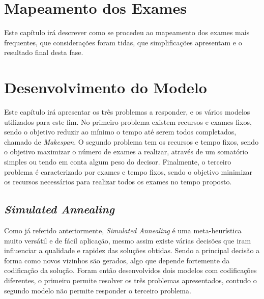 
%

\chapter{Mapeamento dos Exames}
\label{cha:mapeamento_dos_exames}


\epigraphfontsize{\small\itshape}
\setlength\epigraphwidth{12.5cm}
\setlength\epigraphrule{0pt}

Este capítulo irá descrever como se procedeu ao mapeamento dos exames mais frequentes, que considerações foram tidas, que simplificações apresentam e o resultado final desta fase.\\


\chapter{Desenvolvimento do Modelo}
\label{cha:desenvolvimento_do_modelo}

Este capítulo irá apresentar os três problemas a responder, e os vários modelos utilizados para este fim. No primeiro problema existem recursos e exames fixos, sendo o objetivo reduzir ao mínimo o tempo até serem todos completados, chamado de \textit{Makespan}. O segundo problema tem os recursos e tempo fixos, sendo o objetivo maximizar o número de exames a realizar, através de um somatório simples ou tendo em conta algum peso do decisor. Finalmente, o terceiro problema é caracterizado por exames e tempo fixos, sendo o objetivo minimizar os recursos necessários para realizar todos os exames no tempo proposto.\\


\section{\textit{Simulated Annealing}}

Como já referido anteriormente, \textit{Simulated Annealing} é uma meta-heurística muito versátil e de fácil aplicação, mesmo assim existe várias decisões que iram influenciar a qualidade e rapidez das soluções obtidas. Sendo a principal decisão a forma como novos vizinhos são gerados, algo que depende fortemente da codificação da solução. Foram então desenvolvidos dois modelos com codificações diferentes, o primeiro permite resolver os três problemas apresentados, contudo o segundo modelo não permite responder o terceiro problema.\\

